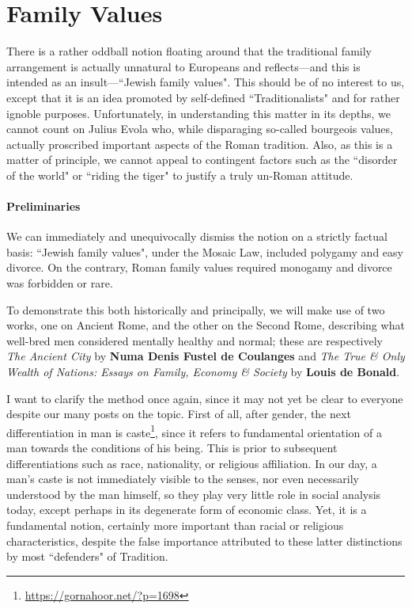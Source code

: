 \section{Family Values}

\label{sec:FamilyValues}

There is a rather oddball notion floating around that the traditional family arrangement is actually unnatural to Europeans and reflects—and this is intended as an insult—``Jewish family values". This should be of no interest to us, except that it is an idea promoted by self-defined ``Traditionalists" and for rather ignoble purposes. Unfortunately, in understanding this matter in its depths, we cannot count on Julius Evola who, while disparaging so-called bourgeois values, actually proscribed important aspects of the Roman tradition. Also, as this is a matter of principle, we cannot appeal to contingent factors such as the ``disorder of the world" or ``riding the tiger" to justify a truly un-Roman attitude.

\paragraph{Preliminaries}
We can immediately and unequivocally dismiss the notion on a strictly factual basis: ``Jewish family values", under the Mosaic Law, included polygamy and easy divorce. On the contrary, Roman family values required monogamy and divorce was forbidden or rare.

To demonstrate this both historically and principally, we will make use of two works, one on Ancient Rome, and the other on the Second Rome, describing what well-bred men considered mentally healthy and normal; these are respectively \textit{The Ancient City} by \textbf{Numa Denis Fustel de Coulanges} and \textit{The True \& Only Wealth of Nations: Essays on Family, Economy \& Society} by \textbf{Louis de Bonald}.

I want to clarify the method once again, since it may not yet be clear to everyone despite our many posts on the topic. First of all, after gender, the next differentiation in man is caste\footnote{\url{https://gornahoor.net/?p=1698}}, since it refers to fundamental orientation of a man towards the conditions of his being. This is prior to subsequent differentiations such as race, nationality, or religious affiliation. In our day, a man's caste is not immediately visible to the senses, nor even necessarily understood by the man himself, so they play very little role in social analysis today, except perhaps in its degenerate form of economic class. Yet, it is a fundamental notion, certainly more important than racial or religious characteristics, despite the false importance attributed to these latter distinctions by most ``defenders" of Tradition.


